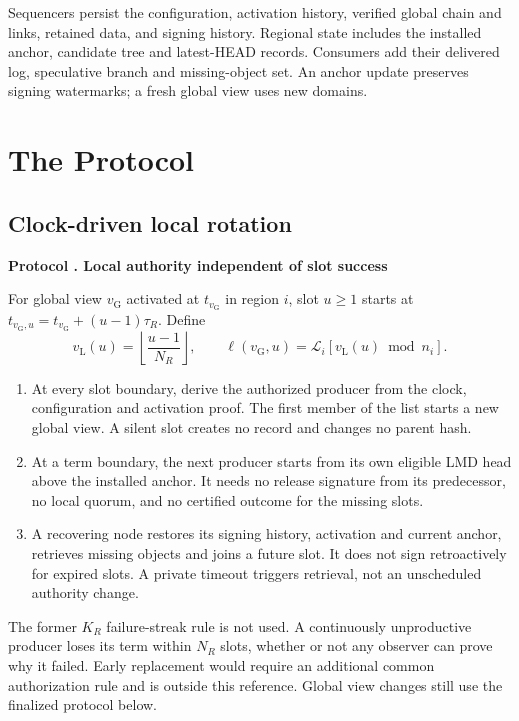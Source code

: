\documentclass[11pt,a4paper,onecolumn]{article}
\newcommand{\gv}{v_{\mathrm G}}
\newcommand{\lv}{v_{\mathrm L}}
\theoremstyle{remark}\newtheorem{example}[definition]{Example}
\newcounter{protocol}
\newenvironment{protocol}[2]{\refstepcounter{protocol}\label{#1}\begin{mdframed}[nobreak=true,linewidth=.6pt,skipabove=10pt,skipbelow=10pt,innertopmargin=8pt,innerbottommargin=8pt]\small\raggedright\noindent\textbf{Protocol \theprotocol. #2}\par\smallskip}{\end{mdframed}}
\begin{document}
Sequencers persist the configuration, activation history, verified global
chain and links, retained data, and signing history. Regional state includes
the installed anchor, candidate tree and latest-HEAD records. Consumers
add their delivered log, speculative branch and missing-object set. An anchor
update preserves signing watermarks; a fresh global view uses new domains.

\section{The Protocol}\label{sec:protocol}
\subsection{Clock-driven local rotation}\label{sec:localchange}
\begin{protocol}{alg:localchange}{Local authority independent of slot success}
For global view $\gv$ activated at $t_{\gv}$ in region $i$, slot $u\geq1$
starts at $t_{\gv,u}=t_{\gv}+(u-1)\tau_R$. Define
\[
 \lv(u)=\left\lfloor\frac{u-1}{N_R}\right\rfloor,\qquad
 \ell(\gv,u)=\mathcal L_i[\lv(u)\bmod n_i].
\]
\begin{enumerate}[label=\textbf{L\arabic*.}]
\item At every slot boundary, derive the authorized producer from the clock,
configuration and activation proof. The first member of the list starts a new
global view. A silent slot creates no record and changes no parent hash.
\item At a term boundary, the next producer starts from its own eligible LMD
head above the installed anchor. It needs no release signature from its
predecessor, no local quorum, and no certified outcome for the missing slots.
\item A recovering node restores its signing history, activation and current
anchor, retrieves missing objects and joins a future slot. It does not sign
retroactively for expired slots. A private timeout triggers retrieval, not an
unscheduled authority change.
\end{enumerate}
\end{protocol}
The former $K_R$ failure-streak rule is not used. A continuously unproductive
producer loses its term within $N_R$ slots, whether or not any observer can
prove why it failed. Early replacement would require an additional common
authorization rule and is outside this reference. Global view changes still
use the finalized protocol below.
\end{document}
